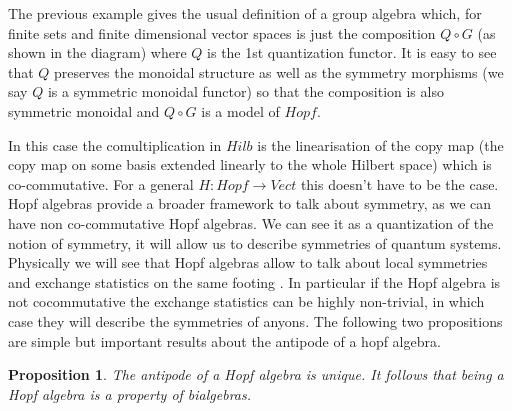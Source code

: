 \documentclass{article}
\newtheorem{proposition}[theorem]{Proposition}
\begin{document}
The previous example gives the usual definition of a group algebra which, for finite sets and finite dimensional vector spaces is just the composition $Q \circ G$ (as shown in the diagram) where $Q$ is the 1st quantization functor. It is easy to see that $Q$ preserves the monoidal structure as well as the symmetry morphisms (we say $Q$ is a symmetric monoidal functor) so that the composition is also symmetric monoidal and $Q \circ G$ is a model of $Hopf$.
\begin{center}
\end{center}
In this case the comultiplication in $Hilb$ is the linearisation of the copy map (the copy map on some basis extended linearly to the whole Hilbert space) which is co-commutative. For a general $H:Hopf \rightarrow Vect$ this doesn't have to be the case. Hopf algebras provide a broader framework to talk about symmetry, as we can have non co-commutative Hopf algebras. We can see it as a quantization of the notion of symmetry, it will allow us to describe symmetries of quantum systems. Physically we will see that Hopf algebras allow to talk about local symmetries and exchange statistics on the same footing \cite{Slingerland02}. In particular if the Hopf algebra is not cocommutative the exchange statistics can be highly non-trivial, in which case they will describe the symmetries of anyons.
The following two propositions are simple but important results about the antipode of a hopf algebra.
\begin{proposition}
	The antipode of a Hopf algebra is unique. It follows that being a Hopf algebra is a property of bialgebras. 
\end{proposition}
\end{document}
